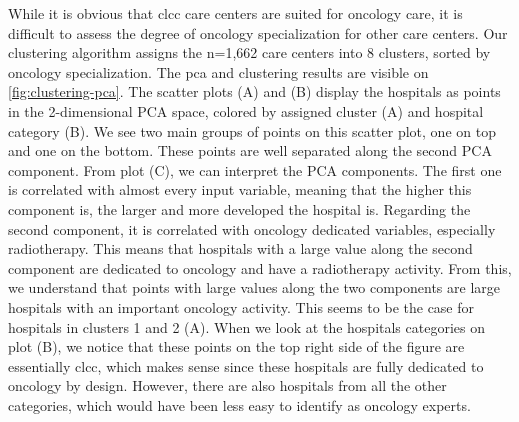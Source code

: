 While it is obvious that \ac{clcc} care centers are suited for oncology care, it
is difficult to assess the degree of oncology specialization for other care
centers. Our clustering algorithm assigns the n=1,662 care centers into 8
clusters, sorted by oncology specialization. The \ac{pca} and clustering results
are visible on \cref{fig:clustering-pca}. The scatter plots (A) and (B) display
the hospitals as points in the 2-dimensional PCA space, colored by assigned
cluster (A) and hospital category (B). We see two main groups of points on this
scatter plot, one on top and one on the bottom. These points are well separated
along the second PCA component. From plot (C), we can interpret the PCA
components. The first one is correlated with almost every input variable,
meaning that the higher this component is, the larger and more developed the
hospital is. Regarding the second component, it is correlated with oncology
dedicated variables, especially radiotherapy. This means that hospitals with a
large value along the second component are dedicated to oncology and have a
radiotherapy activity. From this, we understand that points with large values
along the two components are large hospitals with an important oncology
activity. This seems to be the case for hospitals in clusters 1 and 2 (A).
When we look at the hospitals categories on plot (B), we notice that these
points on the top right side of the figure are essentially \ac{clcc}, which
makes sense since these hospitals are fully dedicated to oncology by design.
However, there are also hospitals from all the other categories, which would
have been less easy to identify as oncology experts.

